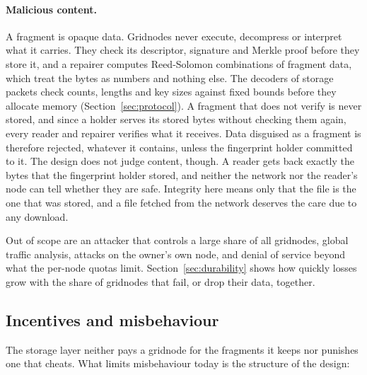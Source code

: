 \documentclass[10pt,a4paper,final]{article}
\begin{document}
\paragraph{Malicious content.} A fragment is opaque data. Gridnodes never execute, decompress or interpret what it
carries. They check its descriptor, signature and Merkle proof before they store it, and a repairer computes
Reed-Solomon combinations of fragment data, which treat the bytes as numbers and nothing else. The decoders of
storage packets check counts, lengths and key sizes against fixed bounds before they allocate memory
(Section~\ref{sec:protocol}). A fragment that does not verify is never stored, and since a holder serves its stored
bytes without checking them again, every reader and repairer verifies what it receives. Data disguised as a fragment
is therefore rejected, whatever it contains, unless the fingerprint holder committed to it. The design does not
judge content, though. A reader gets back exactly the bytes that the fingerprint holder stored, and neither the
network nor the reader's node can tell whether they are safe. Integrity here means only that the file is the one
that was stored, and a file fetched from the network deserves the care due to any download.

Out of scope are an attacker that controls a large share of all gridnodes, global traffic analysis, attacks on the
owner's own node, and denial of service beyond what the per-node quotas limit. Section~\ref{sec:durability} shows
how quickly losses grow with the share of gridnodes that fail, or drop their data, together.

\subsection{Incentives and misbehaviour}
\label{sec:incentives}

The storage layer neither pays a gridnode for the fragments it keeps nor punishes one that cheats. What limits
misbehaviour today is the structure of the design:
\end{document}
